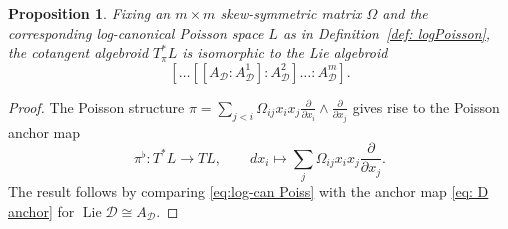 \documentclass{amsart}
\newtheorem{proposition}[theorem]{Proposition}
\numberwithin{equation}{section}
\newcommand{\cD}{\mathcal{D}}
\newcommand{\Lie}{\operatorname{Lie}}
\begin{document}
\begin{proposition}
  Fixing an $m\times m$ skew-symmetric matrix $\Omega$ and the corresponding log-canonical Poisson space $L$ as in Definition~\ref{def: logPoisson}, the cotangent algebroid $T^*_\pi L$ is isomorphic to the Lie algebroid
  \[[\ldots[[A_\cD\!:\!A_\cD^1]\!:\!A_\cD^2] \ldots \!:\!A_\cD^m].\]
\end{proposition}
\begin{proof}
  The Poisson structure $\pi = \sum_{j < i} \Omega_{ij} x_ix_j\frac{\partial}{\partial x_i} \wedge \frac{\partial}{\partial x_j}$ gives rise to the Poisson anchor map
  \begin{equation}	
    \label{eq:log-can Poiss}
    \pi^\flat: T^*L \to TL, \qquad dx_i \mapsto \sum_j \Omega_{ij}  x_ix_j \frac{\partial}{\partial x_j}.
  \end{equation}
  The result follows by comparing \eqref{eq:log-can Poiss} with the anchor map \eqref{eq: D anchor} for $\Lie \cD\cong A_\cD$.
\end{proof}
\end{document}

